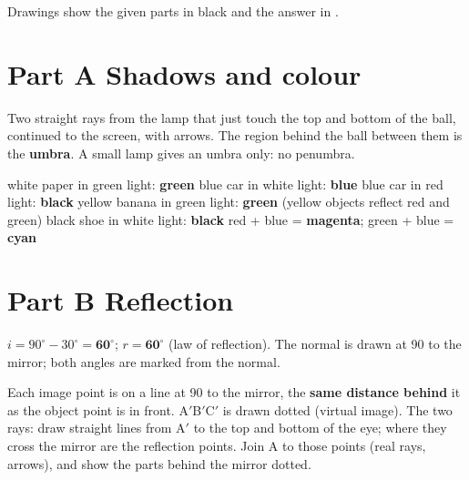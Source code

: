 \documentclass[11pt]{article}
\begin{document}
Drawings show the given parts in black and the answer in .

\section*{Part A \quad Shadows and colour}
 Two straight rays from the lamp that just touch the top and bottom of the ball, continued to the screen, with arrows. The region behind the ball between them is the \textbf{umbra}. A small lamp gives an umbra only: no penumbra.
\begin{center}\TaskShadow[5.6mm]\end{center}
 white paper in green light: \textbf{green} \quad blue car in white light: \textbf{blue} \quad blue car in red light: \textbf{black} \quad yellow banana in green light: \textbf{green} (yellow objects reflect red and green) \quad black shoe in white light: \textbf{black}
 red + blue = \textbf{magenta}; \quad green + blue = \textbf{cyan}

\section*{Part B \quad Reflection}
\begin{minipage}[t]{0.5\textwidth}
\vspace{0pt}
 $i = 90^\circ - 30^\circ = \mathbf{60^\circ}$; $r = \mathbf{60^\circ}$ (law of reflection). The normal is drawn at 90\textdegree{} to the mirror; both angles are marked from the normal.
\end{minipage}\hfill
\begin{minipage}[t]{0.46\textwidth}
\vspace{0pt}\centering{}
\end{minipage}

\begin{minipage}[t]{0.5\textwidth}
\vspace{0pt}
 Each image point is on a line at 90\textdegree{} to the mirror, the \textbf{same distance behind} it as the object point is in front. A$'$B$'$C$'$ is drawn dotted (virtual image).
The two rays: draw straight lines from A$'$ to the top and bottom of the eye; where they cross the mirror are the reflection points. Join A to those points (real rays, arrows), and show the parts behind the mirror dotted.
\end{minipage}\hfill
\begin{minipage}[t]{0.46\textwidth}
\vspace{0pt}\centering\TaskTriangle[6mm]
\end{minipage}
\end{document}
